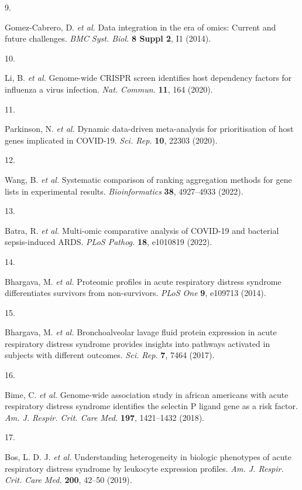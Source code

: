 \documentclass[
  11,
  a4paper,
]{article}
\newlength{\cslhangindent}
\newlength{\csllabelwidth}
\newenvironment{CSLReferences}[2] %
 {\begin{list}{}{%
  \setlength{\itemindent}{0pt}
  \setlength{\leftmargin}{0pt}
  \setlength{\parsep}{0pt}
  \ifodd #1
   \setlength{\leftmargin}{\cslhangindent}
   \setlength{\itemindent}{-1\cslhangindent}
  \fi
  \setlength{\itemsep}{#2\baselineskip}}}
 {\end{list}}
\newcommand{\CSLLeftMargin}[1]{\parbox[t]{\csllabelwidth}{\strut#1\strut}}
\newcommand{\CSLRightInline}[1]{\parbox[t]{\linewidth - \csllabelwidth}{\strut#1\strut}}
\begin{document}
\begin{CSLReferences}{0}{0}
\CSLLeftMargin{9. }%
\CSLRightInline{Gomez-Cabrero, D. \emph{et al.} Data integration in the
era of omics: Current and future challenges. \emph{BMC Syst. Biol.}
\textbf{8 Suppl 2}, I1 (2014).}

\CSLLeftMargin{10. }%
\CSLRightInline{Li, B. \emph{et al.} Genome-wide {CRISPR} screen
identifies host dependency factors for influenza a virus infection.
\emph{Nat. Commun.} \textbf{11}, 164 (2020).}

\CSLLeftMargin{11. }%
\CSLRightInline{Parkinson, N. \emph{et al.} Dynamic data-driven
meta-analysis for prioritisation of host genes implicated in {COVID-19}.
\emph{Sci. Rep.} \textbf{10}, 22303 (2020).}

\CSLLeftMargin{12. }%
\CSLRightInline{Wang, B. \emph{et al.} {{S}ystematic comparison of
ranking aggregation methods for gene lists in experimental results}.
\emph{Bioinformatics} \textbf{38}, 4927--4933 (2022).}

\CSLLeftMargin{13. }%
\CSLRightInline{Batra, R. \emph{et al.} Multi-omic comparative analysis
of {COVID-19} and bacterial sepsis-induced {ARDS}. \emph{PLoS Pathog.}
\textbf{18}, e1010819 (2022).}

\CSLLeftMargin{14. }%
\CSLRightInline{Bhargava, M. \emph{et al.} Proteomic profiles in acute
respiratory distress syndrome differentiates survivors from
non-survivors. \emph{PLoS One} \textbf{9}, e109713 (2014).}

\CSLLeftMargin{15. }%
\CSLRightInline{Bhargava, M. \emph{et al.} Bronchoalveolar lavage fluid
protein expression in acute respiratory distress syndrome provides
insights into pathways activated in subjects with different outcomes.
\emph{Sci. Rep.} \textbf{7}, 7464 (2017).}

\CSLLeftMargin{16. }%
\CSLRightInline{Bime, C. \emph{et al.} Genome-wide association study in
african americans with acute respiratory distress syndrome identifies
the selectin {P} ligand gene as a risk factor. \emph{Am. J. Respir.
Crit. Care Med.} \textbf{197}, 1421--1432 (2018).}

\CSLLeftMargin{17. }%
\CSLRightInline{Bos, L. D. J. \emph{et al.} Understanding heterogeneity
in biologic phenotypes of acute respiratory distress syndrome by
leukocyte expression profiles. \emph{Am. J. Respir. Crit. Care Med.}
\textbf{200}, 42--50 (2019).}


\end{CSLReferences}
\end{document}

